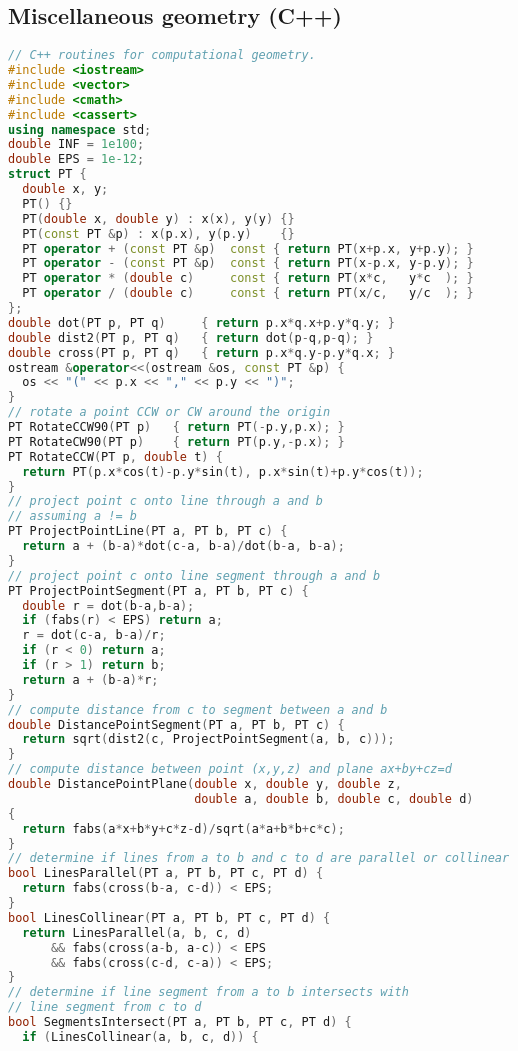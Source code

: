 \subsection{Miscellaneous geometry (C++)}
\begin{lstlisting}[language=C++]
// C++ routines for computational geometry.
#include <iostream>
#include <vector>
#include <cmath>
#include <cassert>
using namespace std;
double INF = 1e100;
double EPS = 1e-12;
struct PT { 
  double x, y; 
  PT() {}
  PT(double x, double y) : x(x), y(y) {}
  PT(const PT &p) : x(p.x), y(p.y)    {}
  PT operator + (const PT &p)  const { return PT(x+p.x, y+p.y); }
  PT operator - (const PT &p)  const { return PT(x-p.x, y-p.y); }
  PT operator * (double c)     const { return PT(x*c,   y*c  ); }
  PT operator / (double c)     const { return PT(x/c,   y/c  ); }
};
double dot(PT p, PT q)     { return p.x*q.x+p.y*q.y; }
double dist2(PT p, PT q)   { return dot(p-q,p-q); }
double cross(PT p, PT q)   { return p.x*q.y-p.y*q.x; }
ostream &operator<<(ostream &os, const PT &p) {
  os << "(" << p.x << "," << p.y << ")"; 
}
// rotate a point CCW or CW around the origin
PT RotateCCW90(PT p)   { return PT(-p.y,p.x); }
PT RotateCW90(PT p)    { return PT(p.y,-p.x); }
PT RotateCCW(PT p, double t) { 
  return PT(p.x*cos(t)-p.y*sin(t), p.x*sin(t)+p.y*cos(t)); 
}
// project point c onto line through a and b
// assuming a != b
PT ProjectPointLine(PT a, PT b, PT c) {
  return a + (b-a)*dot(c-a, b-a)/dot(b-a, b-a);
}
// project point c onto line segment through a and b
PT ProjectPointSegment(PT a, PT b, PT c) {
  double r = dot(b-a,b-a);
  if (fabs(r) < EPS) return a;
  r = dot(c-a, b-a)/r;
  if (r < 0) return a;
  if (r > 1) return b;
  return a + (b-a)*r;
}
// compute distance from c to segment between a and b
double DistancePointSegment(PT a, PT b, PT c) {
  return sqrt(dist2(c, ProjectPointSegment(a, b, c)));
}
// compute distance between point (x,y,z) and plane ax+by+cz=d
double DistancePointPlane(double x, double y, double z,
                          double a, double b, double c, double d)
{
  return fabs(a*x+b*y+c*z-d)/sqrt(a*a+b*b+c*c);
}
// determine if lines from a to b and c to d are parallel or collinear
bool LinesParallel(PT a, PT b, PT c, PT d) { 
  return fabs(cross(b-a, c-d)) < EPS; 
}
bool LinesCollinear(PT a, PT b, PT c, PT d) { 
  return LinesParallel(a, b, c, d)
      && fabs(cross(a-b, a-c)) < EPS
      && fabs(cross(c-d, c-a)) < EPS; 
}
// determine if line segment from a to b intersects with 
// line segment from c to d
bool SegmentsIntersect(PT a, PT b, PT c, PT d) {
  if (LinesCollinear(a, b, c, d)) {

\end{lstlisting}
